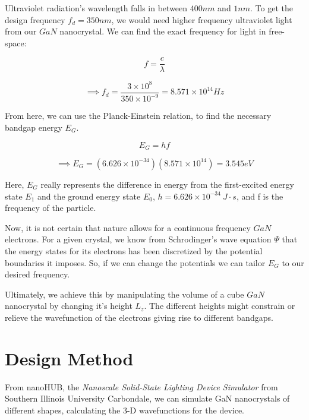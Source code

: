 \documentclass{IEEEtran}
\begin{document}
Ultraviolet radiation's wavelength falls in between \(400nm\) and \(1nm\). To get the design frequency \(f_d = 350nm\), we would need higher frequency ultraviolet light from our \(GaN\) nanocrystal. We can find the exact frequency for light in free-space:

\begin{equation}
    f = \frac{c}{\lambda}
\end{equation}

\begin{equation*}
    \implies f_d = \frac{3 \times 10^8}{350 \times 10^{-9}} = 8.571 \times 10^{14} Hz
\end{equation*}

From here, we can use the Planck-Einstein relation, to find the necessary bandgap energy \(E_G\).

\begin{equation}
    E_G = hf
\end{equation}

\begin{equation*}
    \implies E_G = (6.626 \times 10^{-34})(8.571 \times 10^{14}) = 3.545 eV
\end{equation*}

Here, \(E_G\) really represents the difference in energy from the first-excited energy state \(E_1\) and the ground energy state \(E_0\), \(h = 6.626 \times 10^{-34} ~ J\cdot s\), and f is the frequency of the particle.

Now, it is not certain that nature allows for a continuous frequency \(GaN\) electrons. For a given crystal, we know from Schrodinger's wave equation \(\Psi\) that the energy states for its electrons has been discretized by the potential boundaries it imposes. So, if we can change the potentials we can tailor \(E_G\) to our desired frequency.

Ultimately, we achieve this by manipulating the volume of a cube \(GaN\) nanocrystal by changing it's height \(L_z\). The different heights might constrain or relieve the wavefunction of the electrons giving rise to different bandgaps.


\section{Design Method}

From nanoHUB, the \textit{Nanoscale Solid-State Lighting Device Simulator} \cite{simulator} from Southern Illinois University Carbondale, we can simulate GaN nanocrystals of different shapes, calculating the 3-D wavefunctions for the device.
\end{document}
